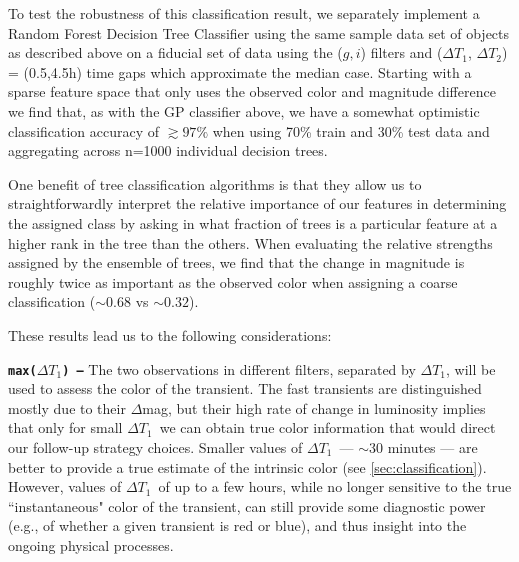 \documentclass[letterpaper,longauthor,trackchanges,twocolumn,onecolappendix,sort&compress]{aastex62}
\newcommand{\dtone}{\ensuremath{\Delta T_1}}
\newcommand{\dttwo}{\ensuremath{\Delta T_2}}
\begin{document}
To test the robustness of this classification result, we separately implement a Random Forest Decision Tree Classifier \citep[implemented using scikit-learn,][]{scikit-learn} using the same sample data set of objects as described above on a fiducial set of data using the ($g,i$) filters and (\dtone, \dttwo) = (0.5,4.5h) time gaps which approximate the median case.  Starting with a sparse feature space that only uses the observed color and magnitude difference we find that, as with the GP classifier above, we have a somewhat optimistic classification accuracy of $\gtrsim 97\%$ when using 70\% train and 30\% test data and aggregating across n=1000 individual decision trees.  

One benefit of tree classification algorithms is that they allow us to straightforwardly interpret the relative importance of our features in determining the assigned class by asking in what fraction of trees is a particular feature at a higher rank in the tree than the others.  When evaluating the relative strengths assigned by the ensemble of trees, we find that the change in magnitude is roughly twice as important as the observed color when assigning a coarse classification ($\sim 0.68$ vs $\sim 0.32$).  

These results lead us to the following considerations:


\vspace{1.5mm}
{\tt {\bf max(\dtone) ---}} The two observations in different filters, separated by \dtone, will be used to assess the color of the transient. 
The fast transients are distinguished mostly due to their $\Delta$mag, but their high rate of change in luminosity implies that only for small \dtone\ we can obtain true color information that would direct our follow-up strategy choices.
Smaller values of \dtone\ --- $\sim$30 minutes --- are better to provide a true estimate of the intrinsic color (see \autoref{sec:classification}). However, values of \dtone\ of up to a few hours, while no longer sensitive to the true ``instantaneous" color of the transient, can still provide some diagnostic power (e.g., of whether a given transient is red or blue), and thus insight into the ongoing physical processes. 

\end{document}
